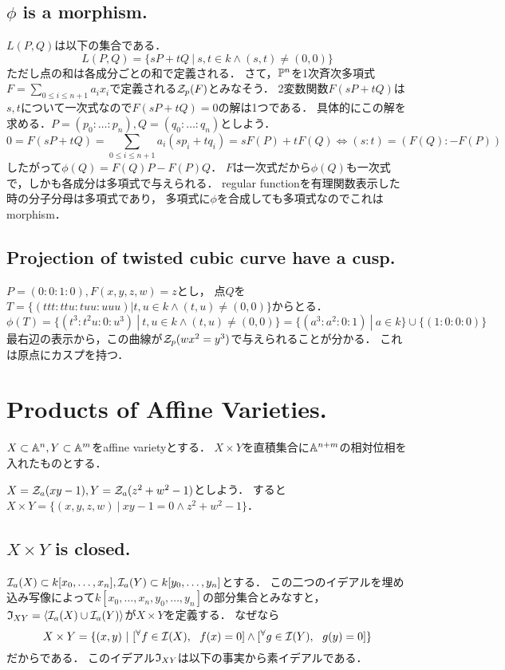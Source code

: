 \documentclass[a4paper]{jsarticle}
\begin{document}
    \subsection{$\phi$ is a morphism.}
    $L(P,Q)$は以下の集合である．
    \[ L(P,Q)=\{ sP+tQ ~|~ s,t \in k \land (s,t) \neq (0,0) \} \]
    ただし点の和は各成分ごとの和で定義される．
    さて，$\mathbb{P}^n$を1次斉次多項式$F=\sum_{0 \leq i \leq n+1}{a_i x_i}$で定義される$\mathcal{Z}_p(F)$とみなそう．
    2変数関数$F(s P+t Q)$は$s,t$について一次式なので$F(s P+t Q)=0$の解は1つである．
    具体的にこの解を求める．$P=(p_0:\dots:p_n), Q=(q_0:\dots:q_n)$としよう．
    \[ 0=F(sP+tQ)=\sum_{0 \leq i \leq n+1}{a_i (sp_i+tq_i)}=s F(P)+t F(Q) \iff (s:t)=(F(Q):-F(P)) \]
    したがって$\phi(Q)=F(Q) P-F(P) Q$．
    $F$は一次式だから$\phi(Q)$も一次式で，しかも各成分は多項式で与えられる．
    regular functionを有理関数表示した時の分子分母は多項式であり，
    多項式に$\phi$を合成しても多項式なのでこれはmorphism．

    \subsection{Projection of twisted cubic curve have a cusp.}
    $P=(0:0:1:0), F(x,y,z,w)=z$とし，
    点$Q$を$T=\{(ttt:ttu:tuu:uuu) | t,u \in k \land (t,u) \neq (0,0)\}$からとる．
    \[ \phi(T)=\{ (t^3:t^2u:0:u^3) ~|~ t,u \in k \land (t,u) \neq (0,0) \}=\{ (a^3:a^2:0:1) ~|~ a \in k \} \cup \{(1:0:0:0)\} \]
    最右辺の表示から，この曲線が$\mathcal{Z}_p(wx^2=y^3)$で与えられることが分かる．
    これは原点にカスプを持つ．

\section{Products of Affine Varieties.} 
    $X \subset \mathbb{A}^n, Y \subset \mathbb{A}^m$をaffine varietyとする．
    $X \times Y$を直積集合に$\mathbb{A}^{n+m}$の相対位相を入れたものとする．

    \begin{Example}
    $X=\mathcal{Z}_a(xy-1), Y=\mathcal{Z}_a(z^2+w^2-1)$としよう．
    すると$X \times Y=\{(x,y,z,w) ~|~ xy-1=0 \land z^2+w^2-1 \}$．
    \end{Example}

    \subsection{$X \times Y$ is closed.}
    $\mathcal{I}_a(X) \subset k[x_{0},\dots,x_{n}], \mathcal{I}_a(Y) \subset k[y_{0},\dots,y_{n}]$とする．
    この二つのイデアルを埋め込み写像によって$k[x_{0},\dots,x_{n},y_{0},\dots,y_{n}]$の部分集合とみなすと，
    $\mathfrak{I}_{XY}=\langle \mathcal{I}_a(X) \cup \mathcal{I}_a(Y) \rangle$が$X \times Y$を定義する．
    なぜなら
    \[ X \times Y=\{ (x,y) ~|~ [{}^{\forall} f \in \mathcal{I}(X),~~ f(x)=0] \land [{}^{\forall} g \in \mathcal{I}(Y),~~ g(y)=0] \} \]
    だからである．
    このイデアル$\mathfrak{I}_{XY}$は以下の事実から素イデアルである．
\end{document}
